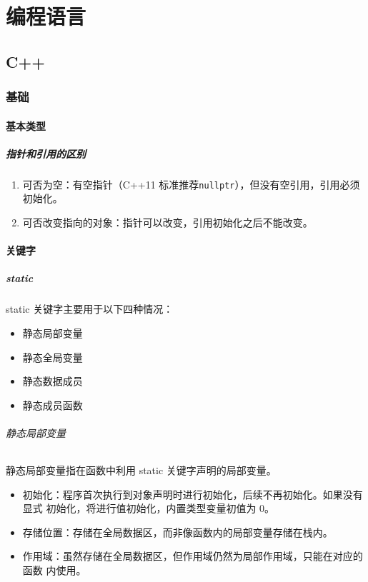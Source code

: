 \part{编程语言}
\chapter{C++}

\section{基础}
\subsection{基本类型}
\subsubsection{指针和引用的区别}
\begin{enumerate}
  \item 可否为空：有空指针（C++11 标准推荐\texttt{nullptr}），但没有空引用，引用必须初始化。
  \item 可否改变指向的对象：指针可以改变，引用初始化之后不能改变。
\end{enumerate}

\subsection{关键字}
\subsubsection{static}
static 关键字主要用于以下四种情况：

\begin{itemize}
  \item 静态局部变量
  \item 静态全局变量
  \item 静态数据成员
  \item 静态成员函数
\end{itemize}

\paragraph{静态局部变量}
静态局部变量指在函数中利用 static 关键字声明的局部变量。

\begin{itemize}
  \item 初始化：程序首次执行到对象声明时进行初始化，后续不再初始化。如果没有显式
    初始化，将进行值初始化，内置类型变量初值为 0。
  \item 存储位置：存储在全局数据区，而非像函数内的局部变量存储在栈内。
  \item 作用域：虽然存储在全局数据区，但作用域仍然为局部作用域，只能在对应的函数
    内使用。
\end{itemize}


